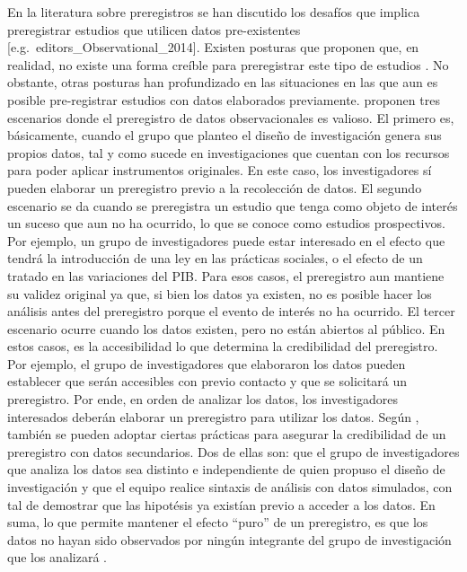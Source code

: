 \documentclass[
]{book}
\begin{document}
En la literatura sobre preregistros se han discutido los desafíos que implica preregistrar estudios que utilicen datos pre-existentes {[}e.g.~editors\_Observational\_2014{]}. Existen posturas que proponen que, en realidad, no existe una forma creíble para preregistrar este tipo de estudios \citep{christensen_Transparency_2018}. No obstante, otras posturas han profundizado en las situaciones en las que aun es posible pre-registrar estudios con datos elaborados previamente. \citet{burlig_Improving_2018} proponen tres escenarios donde el preregistro de datos observacionales es valioso. El primero es, básicamente, cuando el grupo que planteo el diseño de investigación genera sus propios datos, tal y como sucede en investigaciones que cuentan con los recursos para poder aplicar instrumentos originales. En este caso, los investigadores sí pueden elaborar un preregistro previo a la recolección de datos. El segundo escenario se da cuando se preregistra un estudio que tenga como objeto de interés un suceso que aun no ha ocurrido, lo que se conoce como estudios prospectivos. Por ejemplo, un grupo de investigadores puede estar interesado en el efecto que tendrá la introducción de una ley en las prácticas sociales, o el efecto de un tratado en las variaciones del PIB. Para esos casos, el preregistro aun mantiene su validez original ya que, si bien los datos ya existen, no es posible hacer los análisis antes del preregistro porque el evento de interés no ha ocurrido. El tercer escenario ocurre cuando los datos existen, pero no están abiertos al público. En estos casos, es la accesibilidad lo que determina la credibilidad del preregistro. Por ejemplo, el grupo de investigadores que elaboraron los datos pueden establecer que serán accesibles con previo contacto y que se solicitará un preregistro. Por ende, en orden de analizar los datos, los investigadores interesados deberán elaborar un preregistro para utilizar los datos. Según \citet{mertens_Preregistration_2019}, también se pueden adoptar ciertas prácticas para asegurar la credibilidad de un preregistro con datos secundarios. Dos de ellas son: que el grupo de investigadores que analiza los datos sea distinto e independiente de quien propuso el diseño de investigación y que el equipo realice sintaxis de análisis con datos simulados, con tal de demostrar que las hipotésis ya existían previo a acceder a los datos. En suma, lo que permite mantener el efecto ``puro'' de un preregistro, es que los datos no hayan sido observados por ningún integrante del grupo de investigación que los analizará \citep{nosek_preregistration_2018}.
\end{document}

